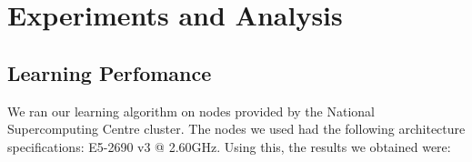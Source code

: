 \documentclass[12pt]{article}
\begin{document}


    \section{Experiments and Analysis}

	\subsection{Learning Perfomance}
	We ran our learning algorithm on nodes provided by the National Supercomputing Centre cluster.
	The nodes we used had the following architecture specifications: E5-2690 v3 @ 2.60GHz.
	Using this, the results we obtained were:
\end{document}

